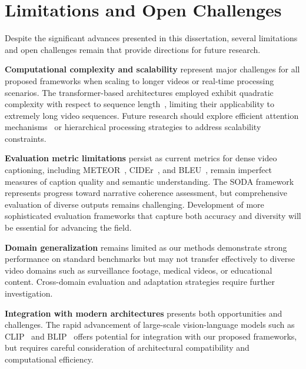 \section{Limitations and Open Challenges}
\label{sec:limitations_challenges}

Despite the significant advances presented in this dissertation, several limitations and open challenges remain that provide directions for future research.


\textbf{Computational complexity and scalability} represent major challenges for all proposed frameworks when scaling to longer videos or real-time processing scenarios. The transformer-based architectures employed exhibit quadratic complexity with respect to sequence length~\cite{Vaswani2017-sc}, limiting their applicability to extremely long video sequences. Future research should explore efficient attention mechanisms~\cite{tay2022efficient} or hierarchical processing strategies to address scalability constraints.

\textbf{Evaluation metric limitations} persist as current metrics for dense video captioning, including METEOR~\cite{Banerjee2005-zo}, CIDEr~\cite{Vedantam2015-ma}, and BLEU~\cite{Papineni2002-sn}, remain imperfect measures of caption quality and semantic understanding. The SODA framework~\cite{Fujita2020-ob} represents progress toward narrative coherence assessment, but comprehensive evaluation of diverse outputs remains challenging. Development of more sophisticated evaluation frameworks that capture both accuracy and diversity will be essential for advancing the field.

\textbf{Domain generalization} remains limited as our methods demonstrate strong performance on standard benchmarks but may not transfer effectively to diverse video domains such as surveillance footage, medical videos, or educational content. Cross-domain evaluation and adaptation strategies require further investigation.

\textbf{Integration with modern architectures} presents both opportunities and challenges. The rapid advancement of large-scale vision-language models such as CLIP~\cite{Radford2021-kx} and BLIP~\cite{li2023blip} offers potential for integration with our proposed frameworks, but requires careful consideration of architectural compatibility and computational efficiency.

